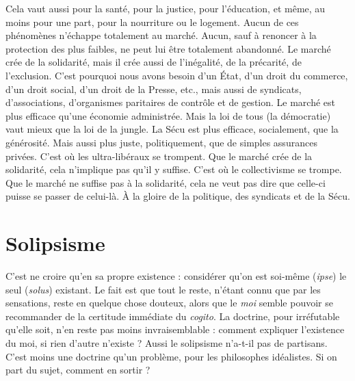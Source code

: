 Cela vaut aussi pour la santé, pour la justice, pour l’éducation, et même, au
moins pour une part, pour la nourriture ou le logement. Aucun de ces phénomènes
n'échappe totalement au marché. Aucun, sauf à renoncer à la protection
des plus faibles, ne peut lui être totalement abandonné. Le marché crée de la
solidarité, mais il crée aussi de l’inégalité, de la précarité, de l'exclusion. C’est
pourquoi nous avons besoin d’un État, d’un droit du commerce, d’un droit
social, d’un droit de la Presse, etc., mais aussi de syndicats, d’associations,
d'organismes paritaires de contrôle et de gestion. Le marché est plus efficace
qu’une économie administrée. Mais la loi de tous (la démocratie) vaut mieux
que la loi de la jungle. La Sécu est plus efficace, socialement, que la générosité.
Mais aussi plus juste, politiquement, que de simples assurances privées. C’est
où les ultra-libéraux se trompent. Que le marché crée de la solidarité, cela
n'implique pas qu’il y suffise. C’est où le collectivisme se trompe. Que le
marché ne suffise pas à la solidarité, cela ne veut pas dire que celle-ci puisse se
passer de celui-là. À la gloire de la politique, des syndicats et de la Sécu.

\section{Solipsisme}
C’est ne croire qu’en sa propre existence : considérer qu’on
est soi-même ({\it ipse}) le seul ({\it solus}) existant. Le fait est que
tout le reste, n’étant connu que par les sensations, reste en quelque chose douteux,
alors que le {\it moi} semble pouvoir se recommander de la certitude immédiate
du {\it cogito}. La doctrine, pour irréfutable qu’elle soit, n’en reste pas moins
invraisemblable : comment expliquer l'existence du moi, si rien d’autre
n'existe ? Aussi le solipsisme n’a-t-il pas de partisans. C’est moins une doctrine
qu’un problème, pour les philosophes idéalistes. Si on part du sujet, comment
en sortir ?

